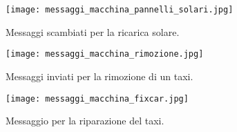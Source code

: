 \begin{figure}[htbp]
	\centering
	\texttt{[image: messaggi\_macchina\_pannelli\_solari.jpg]}
	\caption{Messaggi scambiati per la ricarica solare.}
	\label{fig:messaggi_macchina_pannelli_solari}
\end{figure}

\begin{figure}[htbp]
	\centering
	\texttt{[image: messaggi\_macchina\_rimozione.jpg]}
	\caption{Messaggi inviati per la rimozione di un taxi.}
	\label{fig:messaggi_macchina_rimozione}
\end{figure}

\begin{figure}[htbp]
	\centering
	\texttt{[image: messaggi\_macchina\_fixcar.jpg]}
	\caption{Messaggio per la riparazione del taxi.}
	\label{fig:messaggi_macchina_fixcar}
\end{figure}